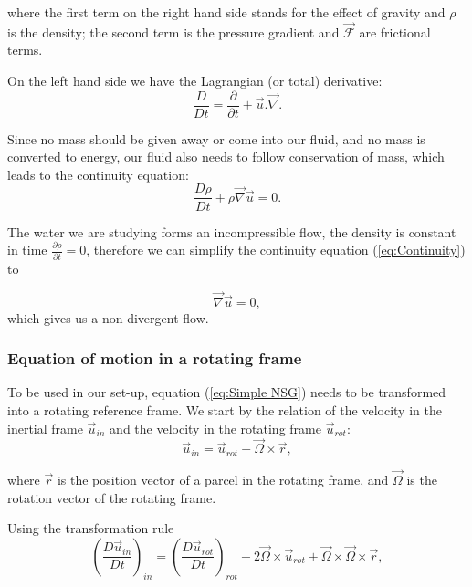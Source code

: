\documentclass[12pt, a4paper]{article} %
\begin{document}
		where the first term on the right hand side stands for the effect of gravity and $\rho$ is the density; the second term is the pressure gradient and $\vec{\mathcal{F}}$ are frictional terms.
		
		On the left hand side we have the Lagrangian (or total) derivative:
		\begin{equation}
			\frac{D}{Dt} = \frac{\partial}{\partial t} + \vec{u}.\vec{\nabla}.
			\label{eq:Lag Dev}
		\end{equation} 
		
		
		Since no mass should be given away or come into our fluid, and no mass is converted to energy, our fluid also needs to follow conservation of mass, which leads to the continuity equation:
		\begin{equation}
			\frac{D\rho}{Dt} + \rho \vec{\nabla} \vec{u} = 0 .
			\label{eq:Continuity}
		\end{equation}
		
		The water we are studying forms an incompressible flow, the density is constant in time %
		 $\frac{\partial\rho}{\partial t} =0 $, therefore we can simplify the continuity equation (\ref{eq:Continuity}) to
		 
		\begin{equation}
			\vec{\nabla} \vec{u} = 0 ,
			\label{eq:nondivergence}
		\end{equation}
		which gives us a non-divergent flow.
		
		
		\subsubsection{Equation of motion in a rotating frame}		%
			To be used in our set-up, equation (\ref{eq:Simple NSG}) needs to be transformed into a rotating reference frame. We start by the relation of the velocity in the inertial frame $\vec{u}_{in}$ and the velocity in the rotating frame $\vec{u}_{rot}$:
			\begin{equation}
				\vec{u}_{in} = \vec{u}_{rot} + \vec{\Omega}\times\vec{r} ,
				\label{eq:Velocity Frames}
			\end{equation}
			
			where $\vec{r}$ is the position vector of a parcel in the rotating frame, and $\vec{\Omega}$ is the rotation vector of the rotating frame.
			
			Using the transformation rule %
			\begin{equation}
				\left(\frac{D\vec{u}_{in}}{Dt}\right)_{in} = \left(\frac{D\vec{u}_{rot}}{Dt}\right)_{rot} + 2\vec{\Omega}\times\vec{u}_{rot} + \vec{\Omega}\times\vec{\Omega}\times\vec{r} ,
				\label{eq: Lag Dev Rot}
			\end{equation}
			
\end{document}
